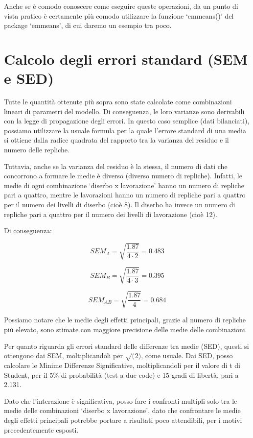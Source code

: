 \documentclass[a4paper,12pt,oneside]{book}
\begin{document}
Anche se è comodo conoscere come eseguire queste operazioni, da un punto di vista pratico è certamente più comodo utilizzare la funzione `emmeans()' del package `emmeans', di cui daremo un esempio tra poco.

\hypertarget{calcolo-degli-errori-standard-sem-e-sed}{%
\section{Calcolo degli errori standard (SEM e SED)}\label{calcolo-degli-errori-standard-sem-e-sed}}

Tutte le quantità ottenute più sopra sono state calcolate come combinazioni lineari di parametri del modello. Di conseguenza, le loro varianze sono derivabili con la legge di propagazione degli errori. In questo caso semplice (dati bilanciati), possiamo utilizzare la usuale formula per la quale l'errore standard di una media si ottiene dalla radice quadrata del rapporto tra la varianza del residuo e il numero delle repliche.

Tuttavia, anche se la varianza del residuo è la stessa, il numero di dati che concorrono a formare le medie è diverso (diverso numero di repliche). Infatti, le medie di ogni combinazione `diserbo x lavorazione' hanno un numero di repliche pari a quattro, mentre le lavorazioni hanno un numero di repliche pari a quattro per il numero dei livelli di diserbo (cioè 8). Il diserbo ha invece un numero di repliche pari a quattro per il numero dei livelli di lavorazione (cioè 12).

Di conseguenza:

\[SEM_A = \sqrt{\frac{1.87}{4 \cdot 2}} = 0.483\]

\[SEM_B = \sqrt{\frac{1.87}{4 \cdot 3}} = 0.395\]

\[SEM_{AB} = \sqrt{\frac{1.87}{4}} = 0.684\]

Possiamo notare che le medie degli effetti principali, grazie al numero di repliche più elevato, sono stimate con maggiore precisione delle medie delle combinazioni.

Per quanto riguarda gli errori standard delle differenze tra medie (SED), questi si ottengono dai SEM, moltiplicandoli per \(\sqrt(2)\), come usuale. Dai SED, posso calcolare le Minime Differenze Significative, moltiplicandoli per il valore di t di Student, per il 5\% di probabilità (test a due code) e 15 gradi di libertà, pari a 2.131.

Dato che l'interazione è significativa, posso fare i confronti multipli solo tra le medie delle combinazioni `diserbo x lavorazione', dato che confrontare le medie degli effetti principali potrebbe portare a risultati poco attendibili, per i motivi precedentemente esposti.
\end{document}
